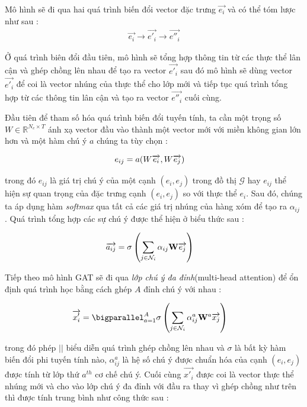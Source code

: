 Mô hình sẽ đi qua hai quá trình biến đổi vector đặc trưng $\overrightarrow{e_i}$ và có thể tóm lược như sau :
\begin{align}
\overrightarrow{e_i} \longrightarrow \overrightarrow{e'_i} \longrightarrow \overrightarrow{e''_i}
\end{align}

Ở quá trình biên đổi đầu tiên, mô hình sẽ tổng hợp thông tin từ các thực thể lân cận và ghép chồng lên nhau để tạo ra vector $\overrightarrow{e'_i}$ sau đó mô hình sẽ dùng vector $\overrightarrow{e'_i}$ để coi là vector nhúng của thực thể cho lớp mới và tiếp tục quá trình tổng hợp từ các thông tin lân cận và tạo ra vector $\overrightarrow{e''_i}$ cuối cùng.

Đầu tiên để tham số hóa quá trình biến đổi tuyến tính, ta cần một trọng số $W \in \mathbb{R}^{N_e \times T}$ ánh xạ vector đầu vào thành một vector mới với miền không gian lớn hơn và một hàm chú ý $a$ chúng ta tùy chọn :

\begin{align}
\centering
{e_{ij}}&={a(W \overrightarrow{e_i}, W \overrightarrow{e_j})}
\end{align}

trong đó $e_{ij}$ là giá trị chú ý của một cạnh $(e_i, e_j)$ trong đồ thị $\mathcal{G}$ hay $e_{ij}$ thể hiện sự quan trọng của đặc trưng cạnh $(e_i, e_j)$ so với thực thể $e_i$. Sau đó, chúng ta áp dụng hàm \textit{softmax} qua tất cả các giá trị nhúng của hàng xóm để tạo ra $\alpha_{ij}$ . Quá trình tổng hợp các sự chú ý được thể hiện ở biểu thức sau : 

\begin{align}
\centering
{\overrightarrow{a_{ij}}}&={\sigma\left(\sum_{j\in \mathcal{N}_i} {\alpha_{ij} \mathbf{W} \overrightarrow{e_j} }\right)}
\end{align}

Tiếp theo mô hình GAT sẽ đi qua \textit{lớp chú ý đa đỉnh}(multi-head attention) để ổn định quá trình học bằng cách ghép $A$ đỉnh chú ý với nhau :

\begin{align}
{\overrightarrow{x'_i}}&={\bigparallel_{a=1}^{A}\sigma\left(\sum_{j\in \mathcal{N}_i}\alpha_{ij}^{a} \mathbf{W}^{a} \overrightarrow{x_{j}} \right)}
\end{align}

trong đó phép $||$ biểu diễn quá trình ghép chồng lên nhau và $\sigma$ là bất kỳ hàm biến đổi phi tuyến tính nào, $\alpha_{ij}^a$ là hệ số chú ý được chuẩn hóa của cạnh $(e_i, e_j)$ được tính từ lớp thứ $a^{th}$	 cơ chế chú ý. Cuối cùng $\overrightarrow{x'_i}$ được coi là vector thực thể nhúng mới và cho vào lớp chú ý đa đỉnh với đầu ra thay vì ghép chồng như trên thì được tính trung bình như công thức sau :

